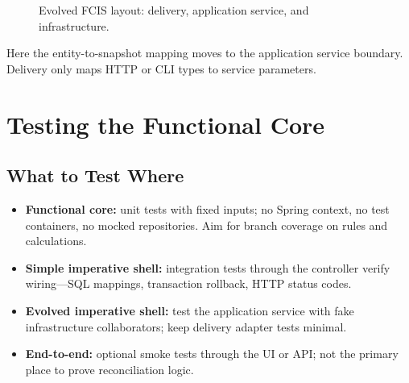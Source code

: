 \begin{figure}[htbp]
\centering
\begin{minipage}{0.85\textwidth}
\end{minipage}
\caption{Evolved FCIS layout: delivery, application service, and infrastructure.}
\label{fig:fcis_package_layout_evolved}
\end{figure}

Here the entity-to-snapshot mapping moves to the application service boundary. Delivery only maps HTTP or CLI types to service parameters.

\section{Testing the Functional Core}
\label{sec:fcis_testing}

\subsection{What to Test Where}
\label{sec:fcis_testing_where}

\begin{itemize}
    \item \textbf{Functional core:} unit tests with fixed inputs; no Spring context, no test containers, no mocked repositories. Aim for branch coverage on rules and calculations.
    \item \textbf{Simple imperative shell:} integration tests through the controller verify wiring---SQL mappings, transaction rollback, HTTP status codes.
    \item \textbf{Evolved imperative shell:} test the application service with fake infrastructure collaborators; keep delivery adapter tests minimal.
    \item \textbf{End-to-end:} optional smoke tests through the UI or API; not the primary place to prove reconciliation logic.
\end{itemize}

